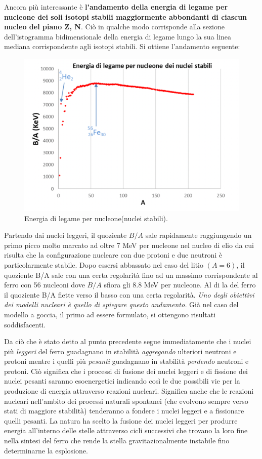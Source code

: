 Ancora più interessante è \textbf{l’andamento della energia di legame per nucleone dei soli isotopi stabili maggiormente
abbondanti di ciascun nucleo del piano Z, N}.
Ciò in qualche modo corrisponde alla sezione dell’istogramma bidimensionale della energia di legame lungo la sua linea
mediana corrispondente agli isotopi stabili.
Si ottiene l’andamento seguente:
\begin{figure}
    \centering
    \includegraphics{../figs/binding-energy-stable}
    \caption{Energia di legame per nucleone(nuclei stabili).}
    \label{fig:binding-energy-stable}
\end{figure}
Partendo dai nuclei leggeri, il quoziente $B/A$ sale rapidamente raggiungendo un primo picco molto marcato ad oltre 7 MeV
per nucleone nel nucleo di elio da cui risulta che la configurazione nucleare con due protoni e due neutroni è
particolarmente stabile.
Dopo essersi abbassato nel caso del litio $(A=6)$, il quoziente B/A sale con una certa regolarità fino ad un massimo
corrispondente al ferro con 56 nucleoni dove $B/A$ sfiora gli $8.8$ MeV per nucleone.
Al di la del ferro il quoziente B/A flette verso il basso con una certa regolarità.
\emph{Uno degli obiettivi dei modelli nucleari è quello di spiegare questo andamento.}
Già nel caso del modello a goccia, il primo ad essere formulato, si ottengono risultati soddisfacenti.

Da ciò che è stato detto al punto precedente segue immediatamente che i nuclei più \emph{leggeri} del ferro guadagnano in
stabilità \emph{aggregando} ulteriori neutroni e protoni mentre i quelli più \emph{pesanti} guadagnano in stabilità 
\emph{perdendo} neutroni e protoni.
Ciò significa che i processi di fusione dei nuclei leggeri e di fissione dei nuclei pesanti saranno esoenergetici
indicando così le due possibili vie per la produzione di energia attraverso reazioni nucleari.
Significa anche che le reazioni nucleari nell’ambito dei processi naturali spontanei (che evolvono sempre verso stati
di maggiore stabilità) tenderanno a fondere i nuclei leggeri e a fissionare quelli pesanti.
La natura ha scelto la fusione dei nuclei leggeri per produrre energia all’interno delle stelle attraverso cicli
successivi che trovano la loro fine nella sintesi del ferro che rende la stella gravitazionalmente instabile fino
determinarne la esplosione.

